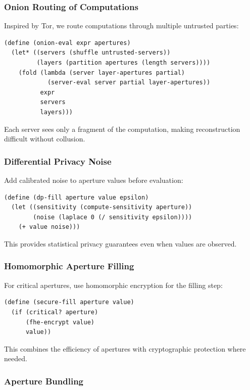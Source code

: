\documentclass[12pt]{article}
\begin{document}
\subsubsection{Onion Routing of Computations}

Inspired by Tor, we route computations through multiple untrusted parties:

\begin{lstlisting}
(define (onion-eval expr apertures)
  (let* ((servers (shuffle untrusted-servers))
         (layers (partition apertures (length servers))))
    (fold (lambda (server layer-apertures partial)
            (server-eval server partial layer-apertures))
          expr
          servers
          layers)))
\end{lstlisting}

Each server sees only a fragment of the computation, making reconstruction difficult without collusion.

\subsubsection{Differential Privacy Noise}

Add calibrated noise to aperture values before evaluation:

\begin{lstlisting}
(define (dp-fill aperture value epsilon)
  (let ((sensitivity (compute-sensitivity aperture))
        (noise (laplace 0 (/ sensitivity epsilon))))
    (+ value noise)))
\end{lstlisting}

This provides statistical privacy guarantees even when values are observed.

\subsubsection{Homomorphic Aperture Filling}

For critical apertures, use homomorphic encryption for the filling step:

\begin{lstlisting}
(define (secure-fill aperture value)
  (if (critical? aperture)
      (fhe-encrypt value)
      value))
\end{lstlisting}

This combines the efficiency of apertures with cryptographic protection where needed.

\subsubsection{Aperture Bundling}
\end{document}
